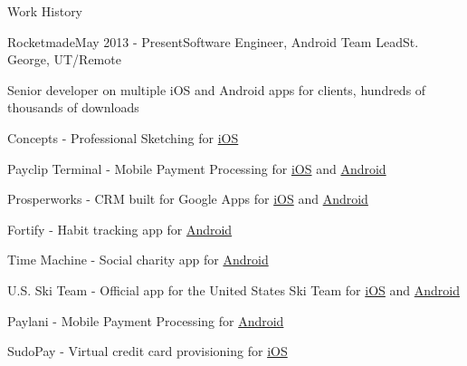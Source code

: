 \documentclass{resume} %
\begin{document}
\begin{rSection}{Work History}
\begin{rSubsection}{Rocketmade}{May 2013 - Present}{Software Engineer, Android Team Lead}{St. George, UT/Remote}
\item Senior developer on multiple iOS and Android apps for clients, hundreds of thousands of downloads
\item Concepts - Professional Sketching for \href{https://itunes.apple.com/app/apple-store/id560586497?mt=8<Paste>}{iOS}
\item Payclip Terminal - Mobile Payment Processing for \href{https://itunes.apple.com/us/app/terminal-de-pagos/id771245360?mt=8}{iOS} and \href{https://play.google.com/store/apps/details?id=com.payclip.clip&hl=en}{Android}
\item Prosperworks - CRM built for Google Apps for \href{https://itunes.apple.com/us/app/prosperworks-smart-easy-crm/id941438829?mt=8}{iOS} and \href{https://play.google.com/store/apps/details?id=com.prosperworks.android&hl=en}{Android}
\item Fortify - Habit tracking app for \href{https://play.google.com/store/apps/details?id=com.fortify.fortifyandroid&hl=en}{Android}
\item Time Machine - Social charity app for \href{http://timemachine.do}{Android}
\item U.S. Ski Team - Official app for the United States Ski Team for \href{https://itunes.apple.com/us/app/u.s.-ski-team/id393563772?mt=8<Paste>}{iOS} and \href{https://play.google.com/store/apps/details?id=com.skiracing}{Android}
\item Paylani - Mobile Payment Processing for \href{https://paylani.com}{Android}
\item SudoPay - Virtual credit card provisioning for \href{https://itunes.apple.com/us/app/sudopay-shop-pay-send-gift/id1097572368?mt=8}{iOS}
\end{rSubsection}

\end{rSection}

\end{document}
